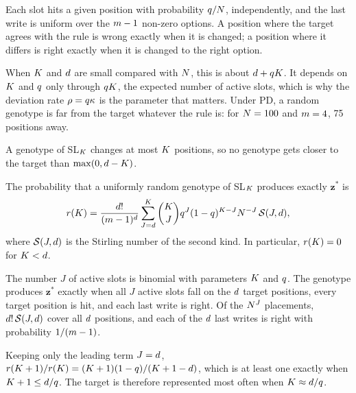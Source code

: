 \begin{IEEEproof}
Each slot hits a given position with probability $q/N$, independently, and the last write is uniform over the $m-1$ non-zero options.
A position where the target agrees with the rule is wrong exactly when it is changed; a position where it differs is right exactly when it is changed to the right option.
\end{IEEEproof}

When $K$ and $d$ are small compared with $N$, this is about $d + qK$.
It depends on $K$ and $q$ only through $qK$, the expected number of active slots, which is why the deviation rate $\rho = q\kappa$ is the parameter that matters.
Under PD, a random genotype is far from the target whatever the rule is: for $N = 100$ and $m = 4$, 75 positions away.

\begin{proposition}[Reach]
\label{prop:floor}
A genotype of SL$_K$ changes at most $K$ positions, so no genotype gets closer to the target than $\max(0, d - K)$.
\end{proposition}

\begin{proposition}
\label{prop:red}
The probability that a uniformly random genotype of SL$_K$ produces exactly $\mathbf{z}^\ast$ is
\begin{equation}
  r(K) = \frac{d!}{(m-1)^{d}} \sum_{J=d}^{K} \binom{K}{J} q^J (1-q)^{K-J} N^{-J}\, \mathcal{S}(J, d),
\end{equation}
where $\mathcal{S}(J,d)$ is the Stirling number of the second kind. In particular, $r(K) = 0$ for $K < d$.
\end{proposition}

\begin{IEEEproof}
The number $J$ of active slots is binomial with parameters $K$ and $q$.
The genotype produces $\mathbf{z}^\ast$ exactly when all $J$ active slots fall on the $d$ target positions, every target position is hit, and each last write is right.
Of the $N^J$ placements, $d!\,\mathcal{S}(J,d)$ cover all $d$ positions, and each of the $d$ last writes is right with probability $1/(m-1)$.
\end{IEEEproof}

\begin{corollary}
\label{cor:kstar}
Keeping only the leading term $J = d$, $r(K+1)/r(K) = (K+1)(1-q)/(K+1-d)$, which is at least one exactly when $K + 1 \le d/q$.
The target is therefore represented most often when $K \approx d/q$.
\end{corollary}

